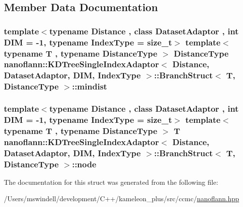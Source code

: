 \subsection{Member Data Documentation}
\hypertarget{structnanoflann_1_1_k_d_tree_single_index_adaptor_1_1_branch_struct_aa62cca16bd04ba7fd2ef25b3d3e8a6fa}{
\subsubsection[{mindist}]{\setlength{\rightskip}{0pt plus 5cm}template$<$typename Distance , class Dataset\-Adaptor , int D\-I\-M = -\/1, typename Index\-Type  = size\-\_\-t$>$ template$<$typename T , typename Distance\-Type $>$ {\bf Distance\-Type} {\bf nanoflann\-::\-K\-D\-Tree\-Single\-Index\-Adaptor}$<$ Distance, Dataset\-Adaptor, D\-I\-M, Index\-Type $>$\-::{\bf Branch\-Struct}$<$ T, {\bf Distance\-Type} $>$\-::mindist}}\label{structnanoflann_1_1_k_d_tree_single_index_adaptor_1_1_branch_struct_aa62cca16bd04ba7fd2ef25b3d3e8a6fa}
\hypertarget{structnanoflann_1_1_k_d_tree_single_index_adaptor_1_1_branch_struct_a86bcc74bb89be6b93db206feb8a3aad7}{
\subsubsection[{node}]{\setlength{\rightskip}{0pt plus 5cm}template$<$typename Distance , class Dataset\-Adaptor , int D\-I\-M = -\/1, typename Index\-Type  = size\-\_\-t$>$ template$<$typename T , typename Distance\-Type $>$ T {\bf nanoflann\-::\-K\-D\-Tree\-Single\-Index\-Adaptor}$<$ Distance, Dataset\-Adaptor, D\-I\-M, Index\-Type $>$\-::{\bf Branch\-Struct}$<$ T, {\bf Distance\-Type} $>$\-::node}}\label{structnanoflann_1_1_k_d_tree_single_index_adaptor_1_1_branch_struct_a86bcc74bb89be6b93db206feb8a3aad7}


The documentation for this struct was generated from the following file\-:\begin{DoxyCompactItemize}
\item 
/\-Users/mswindell/development/\-C++/kameleon\-\_\-plus/src/ccmc/\hyperlink{nanoflann_8hpp}{nanoflann.\-hpp}\end{DoxyCompactItemize}
